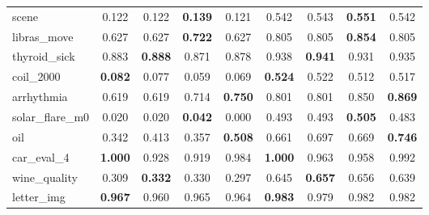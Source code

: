 \begin{figure}[ht]
\begin{tabular}{p{22mm}|*4{p{14mm}}|*4{p{14mm}}}
        scene&\multicolumn{1}{c}{0.122}&\multicolumn{1}{c}{0.122}&\multicolumn{1}{c}{\textbf{0.139}}&\multicolumn{1}{c|}{0.121}&\multicolumn{1}{c}{0.542}&\multicolumn{1}{c}{0.543}&\multicolumn{1}{c}{\textbf{0.551}}&\multicolumn{1}{c}{0.542}\\
        libras\_move&\multicolumn{1}{c}{0.627}&\multicolumn{1}{c}{0.627}&\multicolumn{1}{c}{\textbf{0.722}}&\multicolumn{1}{c|}{0.627}&\multicolumn{1}{c}{0.805}&\multicolumn{1}{c}{0.805}&\multicolumn{1}{c}{\textbf{0.854}}&\multicolumn{1}{c}{0.805}\\
        thyroid\_sick&\multicolumn{1}{c}{0.883}&\multicolumn{1}{c}{\textbf{0.888}}&\multicolumn{1}{c}{0.871}&\multicolumn{1}{c|}{0.878}&\multicolumn{1}{c}{0.938}&\multicolumn{1}{c}{\textbf{0.941}}&\multicolumn{1}{c}{0.931}&\multicolumn{1}{c}{0.935}\\
        coil\_2000&\multicolumn{1}{c}{\textbf{0.082}}&\multicolumn{1}{c}{0.077}&\multicolumn{1}{c}{0.059}&\multicolumn{1}{c|}{0.069}&\multicolumn{1}{c}{\textbf{0.524}}&\multicolumn{1}{c}{0.522}&\multicolumn{1}{c}{0.512}&\multicolumn{1}{c}{0.517}\\
        arrhythmia&\multicolumn{1}{c}{0.619}&\multicolumn{1}{c}{0.619}&\multicolumn{1}{c}{0.714}&\multicolumn{1}{c|}{\textbf{0.750}}&\multicolumn{1}{c}{0.801}&\multicolumn{1}{c}{0.801}&\multicolumn{1}{c}{0.850}&\multicolumn{1}{c}{\textbf{0.869}}\\
        solar\_flare\_m0&\multicolumn{1}{c}{0.020}&\multicolumn{1}{c}{0.020}&\multicolumn{1}{c}{\textbf{0.042}}&\multicolumn{1}{c|}{0.000}&\multicolumn{1}{c}{0.493}&\multicolumn{1}{c}{0.493}&\multicolumn{1}{c}{\textbf{0.505}}&\multicolumn{1}{c}{0.483}\\
        oil&\multicolumn{1}{c}{0.342}&\multicolumn{1}{c}{0.413}&\multicolumn{1}{c}{0.357}&\multicolumn{1}{c|}{\textbf{0.508}}&\multicolumn{1}{c}{0.661}&\multicolumn{1}{c}{0.697}&\multicolumn{1}{c}{0.669}&\multicolumn{1}{c}{\textbf{0.746}}\\
        car\_eval\_4&\multicolumn{1}{c}{\textbf{1.000}}&\multicolumn{1}{c}{0.928}&\multicolumn{1}{c}{0.919}&\multicolumn{1}{c|}{0.984}&\multicolumn{1}{c}{\textbf{1.000}}&\multicolumn{1}{c}{0.963}&\multicolumn{1}{c}{0.958}&\multicolumn{1}{c}{0.992}\\
        wine\_quality&\multicolumn{1}{c}{0.309}&\multicolumn{1}{c}{\textbf{0.332}}&\multicolumn{1}{c}{0.330}&\multicolumn{1}{c|}{0.297}&\multicolumn{1}{c}{0.645}&\multicolumn{1}{c}{\textbf{0.657}}&\multicolumn{1}{c}{0.656}&\multicolumn{1}{c}{0.639}\\
        letter\_img&\multicolumn{1}{c}{\textbf{0.967}}&\multicolumn{1}{c}{0.960}&\multicolumn{1}{c}{0.965}&\multicolumn{1}{c|}{0.964}&\multicolumn{1}{c}{\textbf{0.983}}&\multicolumn{1}{c}{0.979}&\multicolumn{1}{c}{0.982}&\multicolumn{1}{c}{0.982}\\

\end{tabular}
\end{figure}
